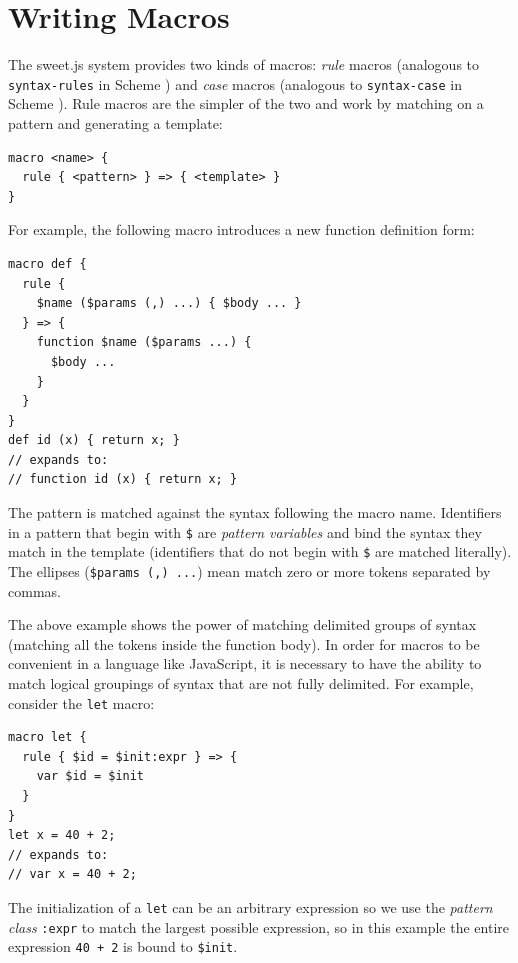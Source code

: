 \documentclass[preprint,10pt]{sigplanconf}
\begin{document}
\section{Writing Macros}
\label{sec:writingMacros}

The sweet.js system provides two kinds of macros: \emph{rule} macros
(analogous to \verb!syntax-rules! in Scheme \cite{Clinger1991})
and \emph{case} macros (analogous to \verb!syntax-case! in
Scheme \cite{Hieb1992}). Rule macros are the simpler of the two and work by matching
on a pattern and generating a template:

\begin{lstlisting}
macro <name> {
  rule { <pattern> } => { <template> }
}
\end{lstlisting}

For example, the following macro introduces a new function definition
form:

\begin{lstlisting}
macro def {
  rule { 
    $name ($params (,) ...) { $body ... } 
  } => {
    function $name ($params ...) {
      $body ...
    }
  }
}
def id (x) { return x; }
// expands to:
// function id (x) { return x; }
\end{lstlisting}

The pattern is matched against the syntax following the macro name.
Identifiers in a pattern that begin with \verb!$! are
\emph{pattern variables} and bind the syntax they match in the
template (identifiers that do not begin with \verb!$! are matched
literally). The ellipses (\verb!$params (,) ...!) mean match zero or more
tokens separated by commas.

The above example shows the power of matching delimited groups of
syntax (\ie matching all the tokens inside the function body). In
order for macros to be convenient in a language like JavaScript, it is
necessary to have the ability to match logical groupings of syntax
that are not fully delimited. For example, consider the
\verb!let! macro:

\begin{lstlisting}
macro let {
  rule { $id = $init:expr } => {
    var $id = $init
  }
}
let x = 40 + 2;
// expands to:
// var x = 40 + 2;
\end{lstlisting}

The initialization of a \verb!let! can be an arbitrary expression
so we use the \emph{pattern class} \verb!:expr! to match the
largest possible expression, so in this example the entire expression
\verb!40 + 2! is bound to \verb!$init!.
\end{document}
